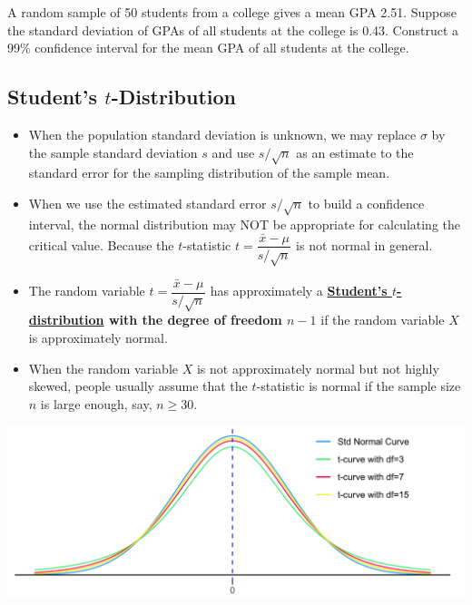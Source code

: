 \begin{example}

A random sample of 50 students from a college gives a mean GPA 2.51.
Suppose the standard deviation of GPAs of all students at the college is
0.43. Construct a 99\% confidence interval for the mean GPA of all
students at the college.

\end{example}
\vspace*{6\baselineskip}


\hypertarget{students-t-distribution}{%
\subsection{\texorpdfstring{Student's
\(t\)-Distribution}{Student's t-Distribution}}\label{students-t-distribution}}

\begin{itemize}
\item
  When the population standard deviation is unknown, we may replace
  \(\sigma\) by the sample standard deviation \(s\) and use
  \(s/\sqrt{n}\) as an estimate to the standard error for the sampling
  distribution of the sample mean.
\item
  When we use the estimated standard error \(s / \sqrt{n}\) to build a
  confidence interval, the normal distribution may NOT be
  appropriate for calculating the critical value. Because the \(t\)-statistic
  \(t=\dfrac{\bar{x}-\mu}{s / \sqrt{n}}\) is not normal in general.
\item
  The random variable \(t=\dfrac{\bar{x}-\mu}{s / \sqrt{n}}\) has approximately a
  \textbf{\href{https://en.wikipedia.org/wiki/Student\%27s_t-distribution}{Student's
  \(t\)-distribution} with the degree of freedom \(n-1\)} 
  if the random variable \(X\) is approximately normal.
\item When the random variable $X$ is not approximately normal but not highly skewed, 
people usually assume that the \(t\)-statistic is normal if the sample size \(n\) is large enough, say, 
\(n\ge 30\).
\end{itemize}

\includegraphics[width=\textwidth]{Figures/t-curves}

